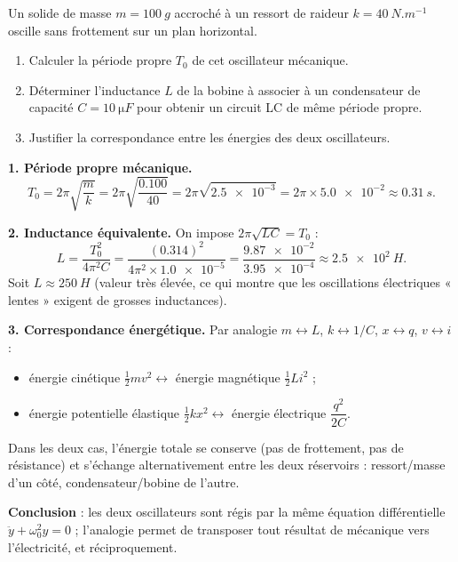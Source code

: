 \documentclass[11pt]{article}
\begin{document}
\begin{exoresolu}
Un solide de masse $m = \SI{100}{g}$ accroché à un ressort de raideur $k = \SI{40}{N.m^{-1}}$ oscille sans frottement sur un plan horizontal.
\begin{enumerate}
\item Calculer la période propre $T_0$ de cet oscillateur mécanique.
\item Déterminer l'inductance $L$ de la bobine à associer à un condensateur de capacité $C = \SI{10}{\micro F}$ pour obtenir un circuit LC de même période propre.
\item Justifier la correspondance entre les énergies des deux oscillateurs.
\end{enumerate}
\tcblower
\textbf{1. Période propre mécanique.}
\[ T_0 = 2\pi\sqrt{\frac{m}{k}} = 2\pi\sqrt{\frac{\num{0,100}}{40}} = 2\pi\sqrt{\num{2,5e-3}} = 2\pi\times \num{5,0e-2} \approx \SI{0,31}{s}. \]

\textbf{2. Inductance équivalente.} On impose $2\pi\sqrt{LC} = T_0$ :
\[ L = \frac{T_0^2}{4\pi^2 C} = \frac{(\num{0,314})^2}{4\pi^2\times \num{1,0e-5}} = \frac{\num{9,87e-2}}{\num{3,95e-4}} \approx \SI{2,5e2}{H}. \]
Soit $L \approx \SI{250}{H}$ (valeur très élevée, ce qui montre que les oscillations électriques « lentes » exigent de grosses inductances).

\textbf{3. Correspondance énergétique.} Par analogie $m \leftrightarrow L$, $k \leftrightarrow 1/C$, $x \leftrightarrow q$, $v \leftrightarrow i$ :
\begin{itemize}
\item énergie cinétique $\frac{1}{2}mv^2 \leftrightarrow$ énergie magnétique $\frac{1}{2}Li^2$ ;
\item énergie potentielle élastique $\frac{1}{2}kx^2 \leftrightarrow$ énergie électrique $\dfrac{q^2}{2C}$.
\end{itemize}
Dans les deux cas, l'énergie totale se conserve (pas de frottement, pas de résistance) et s'échange alternativement entre les deux réservoirs : ressort/masse d'un côté, condensateur/bobine de l'autre.

\textbf{Conclusion} : les deux oscillateurs sont régis par la même équation différentielle $\ddot{y} + \omega_0^2 y = 0$ ; l'analogie permet de transposer tout résultat de mécanique vers l'électricité, et réciproquement.
\end{exoresolu}
\end{document}
